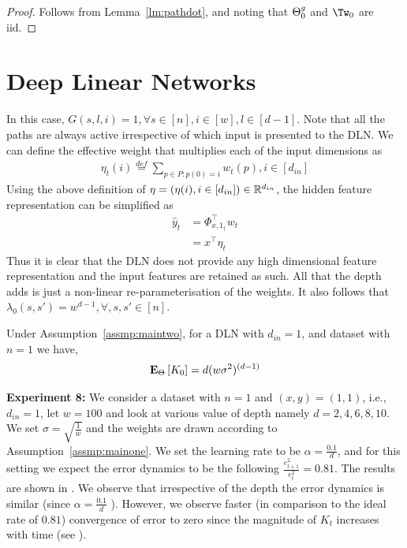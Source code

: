 \begin{proof}
Follows from Lemma~\ref{lm:pathdot}, and noting that ${\Theta}^g_0$ and $\Tw_0$ are iid.
\end{proof}

\section{Deep Linear Networks}

In this case, $G(s,l,i)=1,\forall s\in[n],i\in[w],l\in[d-1]$. Note that all the paths are always active irrespective of which input is presented to the DLN. We can define the effective weight that multiplies each of the input dimensions as 
\begin{align}
\eta_{t}(i)\stackrel{def}= \sum_{p\in P: p(0)=i} w_{t}(p), i\in [d_{in}]
\end{align}
Using the above definition of $\eta=(\eta(i),i\in[d_{in}])\in \mathbb{R}^{d_{in}}$, the hidden feature representation can be simplified as 
\begin{align}
\hat{y}_t&=\Phi^\top_{x,1_{\dagger}} w_{t} \\&=x^\top \eta_{t}
\end{align}
 Thus it is clear that the DLN does not provide any high dimensional feature representation and the input features are retained as such. All that the depth adds is just a non-linear re-parameterisation of the weights. It also follows that $\lambda_0(s,s')=w^{d-1},\forall ,s,s'\in [n]$.

\begin{corollary}\label{th:dln} Under Assumption~\ref{assmp:maintwo}, for a DLN with $d_{in}=1$, and dataset with $n=1$ we have, \begin{align} \mathbf{E}_{{\Theta}}\left[K_0\right]=d(w\sigma^2)^{(d-1)}\end{align}
\end{corollary}


\textbf{Experiment 8:} We consider a dataset with $n=1$ and $(x,y)=(1,1)$, i.e., $d_{in}=1$, let $w=100$ and look at various value of depth namely  $d=2,4,6,8,10$. We set $\sigma=\sqrt{\frac{1}{w}}$ and the weights are drawn according to Assumption~\ref{assmp:mainone}. We set the learning rate to be $\alpha=\frac{0.1}{d}$, and for this setting we expect the error dynamics to be the following $\frac{e^2_{t+1}}{e^2_t}=0.81$.
The results are shown in . We observe that irrespective of the depth the error dynamics is similar (since $\alpha=\frac{0.1}{d}$ ). However, we observe faster (in comparison to the ideal rate of $0.81$) convergence of error to zero since the magnitude of $K_t$ increases with time (see ).

